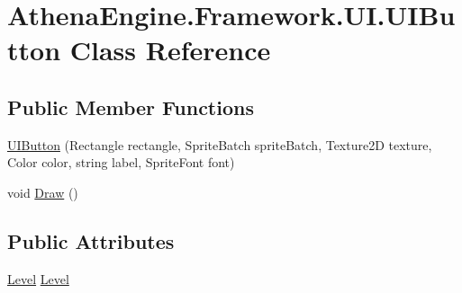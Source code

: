\hypertarget{class_athena_engine_1_1_framework_1_1_u_i_1_1_u_i_button}{\section{Athena\-Engine.\-Framework.\-U\-I.\-U\-I\-Button Class Reference}
\label{class_athena_engine_1_1_framework_1_1_u_i_1_1_u_i_button}
}
\subsection*{Public Member Functions}
\begin{DoxyCompactItemize}
\item 
\hyperlink{class_athena_engine_1_1_framework_1_1_u_i_1_1_u_i_button_aa12071215630be5fd4a57b32c45867d2}{U\-I\-Button} (Rectangle rectangle, Sprite\-Batch sprite\-Batch, Texture2\-D texture, Color color, string label, Sprite\-Font font)
\item 
void \hyperlink{class_athena_engine_1_1_framework_1_1_u_i_1_1_u_i_button_a825a19a8539070d7ec354774d1808089}{Draw} ()
\end{DoxyCompactItemize}
\subsection*{Public Attributes}
\begin{DoxyCompactItemize}
\item 
\hyperlink{class_athena_engine_1_1_framework_1_1_gameplay_1_1_level}{Level} \hyperlink{class_athena_engine_1_1_framework_1_1_u_i_1_1_u_i_button_a11fe0fd5a2e15a336ca9a42d779dd3a3}{Level}
\end{DoxyCompactItemize}


